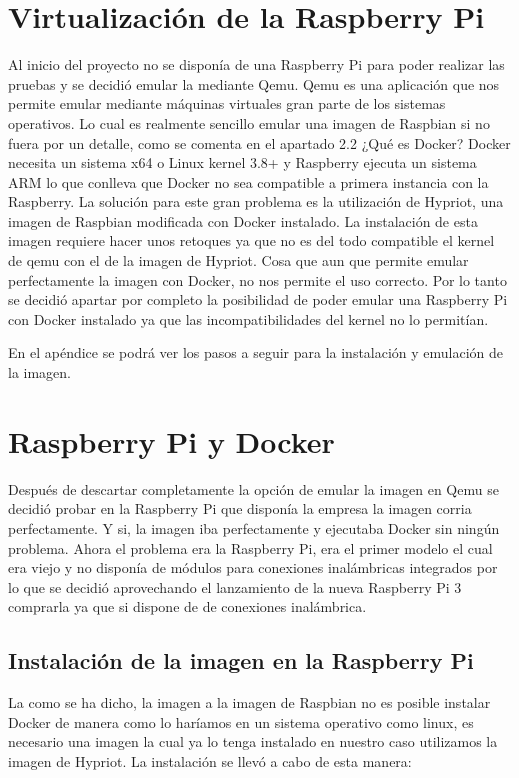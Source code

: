 \section{Virtualización de la Raspberry Pi}

Al inicio del proyecto no se disponía de una Raspberry Pi para poder realizar las pruebas y se decidió emular la mediante Qemu. 
Qemu es una aplicación que nos permite emular mediante máquinas virtuales gran parte de los sistemas operativos. 
Lo cual es realmente sencillo emular una imagen de Raspbian si no fuera por un detalle, como se comenta en el apartado 2.2 ¿Qué es Docker? Docker necesita un sistema x64 o Linux kernel 3.8+ y Raspberry ejecuta un sistema ARM lo que conlleva que Docker no sea compatible a primera instancia con la Raspberry. 
La solución para este gran problema es la utilización de Hypriot, una imagen de Raspbian modificada con Docker instalado. 
La instalación de esta imagen requiere hacer unos retoques ya que no es del todo compatible el kernel de qemu con el de la imagen de Hypriot. Cosa que aun que permite emular perfectamente la imagen con Docker, no nos permite el uso correcto. Por lo tanto se decidió apartar por completo la posibilidad de poder emular una Raspberry Pi con Docker instalado ya que las incompatibilidades del kernel no lo permitían.

En el apéndice se podrá ver los pasos a seguir para la instalación y emulación de la imagen. 

\section{Raspberry Pi y Docker}

Después de descartar completamente la opción de emular la imagen en Qemu se decidió probar en la Raspberry Pi que disponía la empresa la imagen corria perfectamente. Y si, la imagen iba perfectamente y ejecutaba Docker sin ningún problema. Ahora el problema era la Raspberry Pi, era el primer modelo el cual era viejo y no disponía de módulos para conexiones inalámbricas integrados por lo que se decidió aprovechando el lanzamiento de la nueva Raspberry Pi 3 comprarla ya que si dispone de de conexiones inalámbrica. 

\subsection{Instalación de la imagen en la Raspberry Pi}

La como se ha dicho, la imagen a la imagen de Raspbian no es posible instalar Docker de manera como lo haríamos en un sistema operativo como linux, es necesario una imagen la cual ya lo tenga instalado en nuestro caso utilizamos la imagen de Hypriot. La instalación se llevó a cabo de esta manera:


